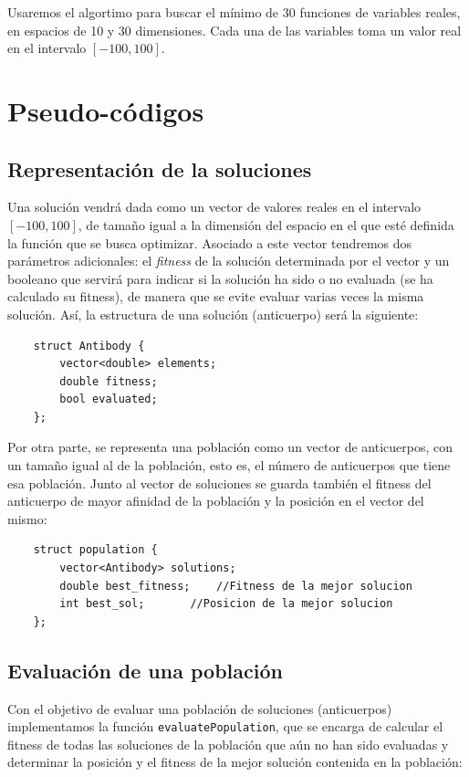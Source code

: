 \documentclass[10pt,a4paper]{article}
\begin{document}
	Usaremos el algortimo para buscar el mínimo de 30 funciones de variables reales, en espacios de 10 y 30 dimensiones. Cada una de las variables toma un valor real en el intervalo $ [-100,100] $.
\newpage
	\section{Pseudo-códigos}
	
	\subsection{Representación de la soluciones}
	
	Una solución vendrá dada como un vector de valores reales en el intervalo $ [-100,100] $, de tamaño igual a la dimensión del espacio en el que esté definida la función que se busca optimizar.
	Asociado a este vector tendremos dos parámetros adicionales: el \textit{fitness} de la solución determinada por el vector y un booleano que servirá para indicar si la solución ha sido o no evaluada (se ha calculado su fitness), de manera que se evite evaluar varias veces la misma solución. Así, la estructura de una solución (anticuerpo) será la siguiente:
	
	\begin{lstlisting}
	struct Antibody {
		vector<double> elements;
		double fitness;
		bool evaluated;
	};
	\end{lstlisting}
	
	Por otra parte, se representa una población como un vector de anticuerpos, con un tamaño igual al de la población, esto es, el número de anticuerpos que tiene esa población. Junto al vector de soluciones se guarda también el fitness del anticuerpo de mayor afinidad de la población y la posición en el vector del mismo:
	
		\begin{lstlisting}
	struct population {
		vector<Antibody> solutions;
		double best_fitness;	//Fitness de la mejor solucion
		int best_sol;		//Posicion de la mejor solucion
	};
	\end{lstlisting}
	
	
	\subsection{Evaluación de una población}
	Con el objetivo de evaluar una población de soluciones (anticuerpos) implementamos la función \lstinline|evaluatePopulation|, que se encarga de calcular el fitness de todas las soluciones de la población que aún no han sido evaluadas y determinar la posición y el fitness de la mejor solución contenida en la población:
	
\end{document}
